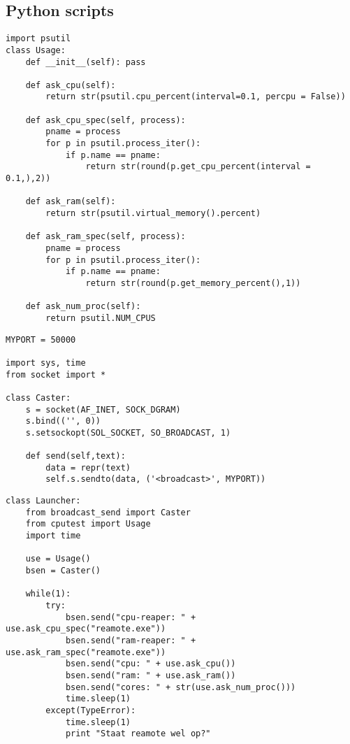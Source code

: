 \documentclass[DIV=calc]{scrartcl}
\begin{document}
\subsection{Python scripts}
\begin{lstlisting}[caption={cputest.py}, label=Processor- en geheugengebruik opvragen van pc]
import psutil
class Usage:
    def __init__(self): pass
 
    def ask_cpu(self):
        return str(psutil.cpu_percent(interval=0.1, percpu = False))
 
    def ask_cpu_spec(self, process):
        pname = process
        for p in psutil.process_iter():
            if p.name == pname:
                return str(round(p.get_cpu_percent(interval = 0.1,),2))
 
    def ask_ram(self):
        return str(psutil.virtual_memory().percent)
 
    def ask_ram_spec(self, process):
        pname = process
        for p in psutil.process_iter():
            if p.name == pname:
                return str(round(p.get_memory_percent(),1))
 
    def ask_num_proc(self):
        return psutil.NUM_CPUS
\end{lstlisting}
\begin{lstlisting}[caption={broadcast\_send.py}, label=Server laten broadcasten op bepaalde poort]
MYPORT = 50000
 
import sys, time
from socket import *
 
class Caster:
    s = socket(AF_INET, SOCK_DGRAM)
    s.bind(('', 0))
    s.setsockopt(SOL_SOCKET, SO_BROADCAST, 1)
 
    def send(self,text):
        data = repr(text)
        self.s.sendto(data, ('<broadcast>', MYPORT))
\end{lstlisting}
\begin{lstlisting}[caption={launcher.py}, label=launcher langs serverzijde]
class Launcher:
    from broadcast_send import Caster
    from cputest import Usage
    import time
 
    use = Usage()
    bsen = Caster()
 
    while(1):
        try:
            bsen.send("cpu-reaper: " + use.ask_cpu_spec("reamote.exe"))
            bsen.send("ram-reaper: " + use.ask_ram_spec("reamote.exe"))  
            bsen.send("cpu: " + use.ask_cpu())
            bsen.send("ram: " + use.ask_ram())
            bsen.send("cores: " + str(use.ask_num_proc()))
            time.sleep(1)
        except(TypeError):
            time.sleep(1)
            print "Staat reamote wel op?"
\end{lstlisting}
\end{document}
